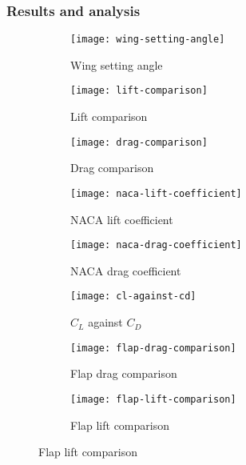 \documentclass[../../main.tex]{subfiles}
\begin{document}
\subsubsection{Results and analysis} \label{sec:design-process:interim-design-review:wind-tunnel-test:results-and-analysis}

\begin{figure}[H]
    \centering
    \begin{subfigure}[b]{0.49\columnwidth}
        \centering
        \texttt{[image: wing-setting-angle]}
        \caption{Wing setting angle}
        \label{fig:wind-tunnel-results:wing-setting-angle}
    \end{subfigure}
    \hfill
    \begin{subfigure}[b]{0.49\columnwidth}
        \centering
        \texttt{[image: lift-comparison]}
        \caption{Lift comparison}
        \label{fig:wind-tunnel-results:lift-comparison}
    \end{subfigure}

    \begin{subfigure}[b]{0.49\columnwidth}
        \centering
        \texttt{[image: drag-comparison]}
        \caption{Drag comparison}
        \label{fig:wind-tunnel-results:drag-comparison}
    \end{subfigure}
    \hfill
    \begin{subfigure}[b]{0.49\columnwidth}
        \centering
        \texttt{[image: naca-lift-coefficient]}
        \caption{NACA lift coefficient}
        \label{fig:wind-tunnel-results:naca-lift-coefficient}
    \end{subfigure}

    \begin{subfigure}[b]{0.49\columnwidth}
        \centering
        \texttt{[image: naca-drag-coefficient]}
        \caption{NACA drag coefficient}
        \label{fig:wind-tunnel-results:naca-drag-coefficient}
    \end{subfigure}
    \hfill
    \begin{subfigure}[b]{0.49\columnwidth}
        \centering
        \texttt{[image: cl-against-cd]}
        \caption{$C_L$ against $C_D$}
        \label{fig:wind-tunnel-results:cl-against-cd}
    \end{subfigure}

    \begin{subfigure}[b]{0.49\columnwidth}
        \centering
        \texttt{[image: flap-drag-comparison]}
        \caption{Flap drag comparison}
        \label{fig:wind-tunnel-results:flap-drag-comparison}
    \end{subfigure}
    \hfill
    \begin{subfigure}[b]{0.49\columnwidth}
        \centering
        \texttt{[image: flap-lift-comparison]}
        \caption{Flap lift comparison}
        \label{fig:wind-tunnel-results:flap-lift-comparison}
    \end{subfigure}


\end{figure}
\end{document}
